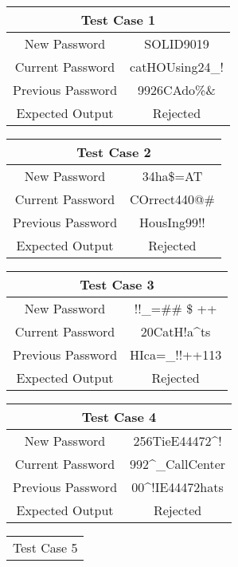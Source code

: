\documentclass[12pt,letterpaper]{article}
\begin{document}
\begin{center}

  
  \begin{tabular}{||c|c||}
  \hline
  \multicolumn{2}{||c||}{Test Case 1} \\
  \hline
  New Password & SOLID9019 \\
  \hline
  Current Password & catHOUsing24\_! \\
  \hline
  Previous Password & 9926CAdo\%\& \\
  \hline
  Expected Output & Rejected \\
  \hline
  \end{tabular}
  \vspace{1mm}
  \begin{tabular}{||c|c||}
  \hline
  \multicolumn{2}{||c||}{Test Case 2} \\
  \hline
  New Password & 34ha\$=AT \\
  \hline
  Current Password & COrrect440@\# \\
  \hline
  Previous Password & HousIng99!! \\
  \hline
  Expected Output & Rejected \\
  \hline
  \end{tabular}
  \begin{tabular}{||c|c||}
  \hline
  \multicolumn{2}{||c||}{Test Case 3} \\
  \hline
  New Password & !!\_=\#\# \$ ++ \\
  \hline
  Current Password & 20CatH!a\^{}ts \\
  \hline
  Previous Password & HIca=\_!!++113 \\
  \hline
  Expected Output & Rejected \\
  \hline
  \end{tabular}
  \vspace{1mm}
  \begin{tabular}{||c|c||}
  \hline
  \multicolumn{2}{||c||}{Test Case 4} \\
  \hline
  New Password &  256TieE44472\^{}! \\
  \hline
  Current Password & 992\^{}\_CallCenter \\
  \hline
  Previous Password & 00\^{}!IE44472hats \\
  \hline
  Expected Output & Rejected \\
  \hline
  \end{tabular}
  \begin{tabular}{||c|c||}
  \hline
  \multicolumn{2}{||c||}{Test Case 5} \\

\end{tabular}
\end{center}
\end{document}
